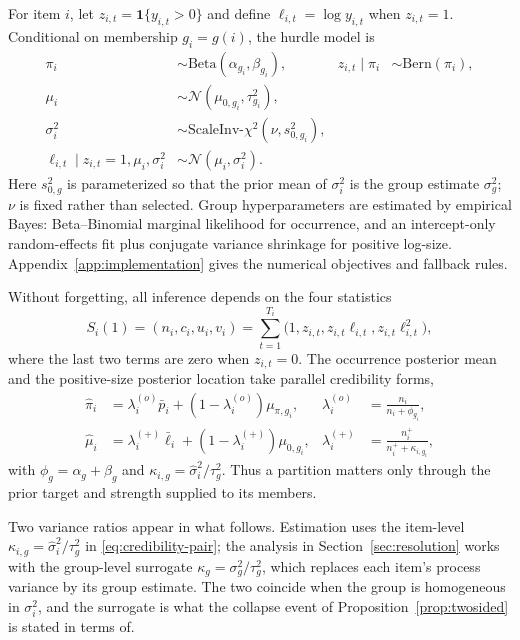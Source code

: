 \documentclass[twocolumn,10pt]{article}
\theoremstyle{definition}
\newcommand{\ind}[1]{\mathbf{1}\{#1\}}
\begin{document}
For item $i$, let $z_{i,t}=\ind{y_{i,t}>0}$ and define
$\ell_{i,t}=\log y_{i,t}$ when $z_{i,t}=1$. Conditional on membership
$g_i=g(i)$, the hurdle model is
\begin{equation}
\begin{aligned}
\pi_i &\sim \mathrm{Beta}(\alpha_{g_i},\beta_{g_i}), &
z_{i,t}\mid\pi_i &\sim \mathrm{Bern}(\pi_i),\\
\mu_i &\sim \mathcal{N}(\mu_{0,g_i},\tau^2_{g_i}),\\
\sigma_i^2 &\sim \mathrm{ScaleInv}\text{-}\chi^2
  (\nu,s^2_{0,g_i}),\\
\ell_{i,t}\mid z_{i,t}{=}1,\mu_i,\sigma_i^2
&\sim \mathcal{N}(\mu_i,\sigma_i^2).
\end{aligned}
\label{eq:model}
\end{equation}
Here $s^2_{0,g}$ is parameterized so that the prior mean of
$\sigma_i^2$ is the group estimate $\sigma_g^2$; $\nu$ is fixed rather
than selected. Group hyperparameters are estimated by empirical Bayes:
Beta--Binomial marginal likelihood for occurrence, and an
intercept-only random-effects fit plus conjugate variance shrinkage for
positive log-size. Appendix~\ref{app:implementation} gives the numerical
objectives and fallback rules.

Without forgetting, all inference depends on the four statistics
\[
S_i(1)=(n_i,c_i,u_i,v_i)
=\sum_{t=1}^{T_i}
  \bigl(1,z_{i,t},z_{i,t}\ell_{i,t},z_{i,t}\ell_{i,t}^2\bigr),
\]
where the last two terms are zero when $z_{i,t}=0$. The occurrence
posterior mean and the positive-size posterior location take parallel
credibility forms,
\begin{align}
\hat\pi_i
&=\lambda_i^{(o)}\bar p_i+(1-\lambda_i^{(o)})\mu_{\pi,g_i},
&\lambda_i^{(o)}&=\frac{n_i}{n_i+\phi_{g_i}},\nonumber\\
\hat\mu_i
&=\lambda_i^{(+)}\bar\ell_i+(1-\lambda_i^{(+)})\mu_{0,g_i},
&\lambda_i^{(+)}&=\frac{n_i^+}{n_i^++\kappa_{i,g_i}},
\label{eq:credibility-pair}
\end{align}
with $\phi_g=\alpha_g+\beta_g$ and
$\kappa_{i,g}=\hat\sigma_i^2/\tau_g^2$. Thus a partition matters only
through the prior target and strength supplied to its members.

Two variance ratios appear in what follows. Estimation uses the item-level
$\kappa_{i,g}=\hat\sigma_i^2/\tau_g^2$ in
\eqref{eq:credibility-pair}; the analysis in
Section~\ref{sec:resolution} works with the group-level surrogate
$\kappa_g=\sigma_g^2/\tau_g^2$, which replaces each item's process
variance by its group estimate. The two coincide when the group is
homogeneous in $\sigma_i^2$, and the surrogate is what the collapse event
of Proposition~\ref{prop:twosided} is stated in terms of.
\end{document}
